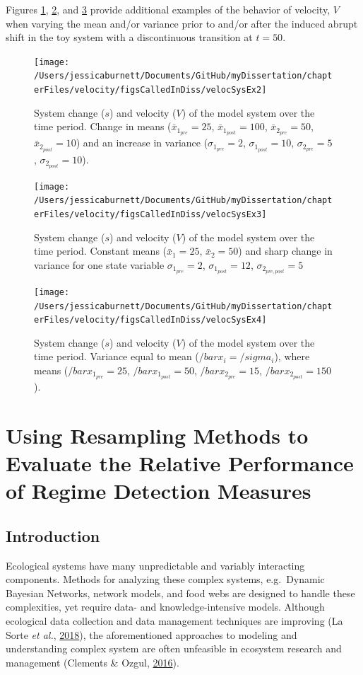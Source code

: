 \documentclass[12pt,twoside,openany]{reedthesis}
\begin{document}
Figures \ref{fig:velocSysEx2}, \ref{fig:velocSysEx3}, and \ref{fig:velocSysEx4} provide additional examples of the behavior of velocity, \(V\) when varying the mean and/or variance prior to and/or after the induced abrupt shift in the toy system with a discontinuous transition at \(t=50\).
\begin{figure}
\texttt{[image: /Users/jessicaburnett/Documents/GitHub/myDissertation/chapterFiles/velocity/figsCalledInDiss/velocSysEx2]} \caption{System change ($s$) and velocity ($V$) of the model system over the time period. Change in means ($\bar{x}_{1_{pre}}=25$, $\bar{x}_{1_{post}}=100$, $\bar{x}_{2_{pre}}=50$, $\bar{x}_{2_{post}}=10$) and an increase in variance ($\sigma_{1_{pre}}=2$, $\sigma_{1_{post}}=10$, $\sigma_{2_{pre}}=5$,  $\sigma_{2_{post}}=10$).}\label{fig:velocSysEx2}
\end{figure}
\newpage
\begin{figure}
\texttt{[image: /Users/jessicaburnett/Documents/GitHub/myDissertation/chapterFiles/velocity/figsCalledInDiss/velocSysEx3]} \caption{System change ($s$) and velocity ($V$) of the model system over the time period. Constant means ($\bar{x}_1=25$, $\bar{x}_2=50$) and sharp change in variance for one state variable $\sigma_{1_{pre}} = 2$, $\sigma_{1_{post}} = 12$, $\sigma_{2_{pre,post}} = 5$}\label{fig:velocSysEx3}
\end{figure}
\newpage
\begin{figure}
\texttt{[image: /Users/jessicaburnett/Documents/GitHub/myDissertation/chapterFiles/velocity/figsCalledInDiss/velocSysEx4]} \caption{System change ($s$) and velocity ($V$) of the model system over the time period. Variance equal to mean ($/bar{x_i}=/sigma_i$), where means ($/bar{x}_{1_{pre}}=25$, $/bar{x}_{1_{post}}=50$, $/bar{x}_{2_{pre}}=15$, $/bar{x}_{2_{post}}=150$).}\label{fig:velocSysEx4}
\end{figure}
\hypertarget{resampling}{%
\chapter{Using Resampling Methods to Evaluate the Relative Performance of Regime Detection Measures}\label{resampling}}

\hypertarget{introduction-4}{%
\section{Introduction}\label{introduction-4}}

Ecological systems have many unpredictable and variably interacting components. Methods for analyzing these complex systems, e.g.~Dynamic Bayesian Networks, network models, and food webs are designed to handle these complexities, yet require data- and knowledge-intensive models. Although ecological data collection and data management techniques are improving (La Sorte \emph{et al.}, \protect\hyperlink{ref-lasorte2018opportunities}{2018}), the aforementioned approaches to modeling and understanding complex system are often unfeasible in ecosystem research and management (Clements \& Ozgul, \protect\hyperlink{ref-clements_including_2016}{2016}).
\end{document}
